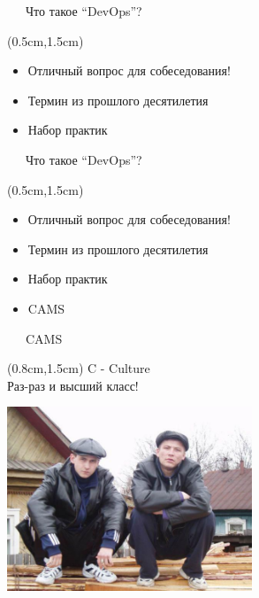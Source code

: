 \documentclass[xetex,18pt,aspectratio=43]{beamer}
\begin{document}
\begin{Large}
\begin{frame}{\ \ \ Что такое \enquote{DevOps}?}
\begin{textblock*}{\framewidth-0.8cm}(0.5cm,1.5cm)
\begin{itemize}
  \item Отличный вопрос для собеседования!
  \item Термин из прошлого десятилетия
  \item Набор практик
\end{itemize}
\end{textblock*}
\end{frame}

\begin{frame}{\ \ \ Что такое \enquote{DevOps}?}
\begin{textblock*}{\framewidth-0.8cm}(0.5cm,1.5cm)
\begin{itemize}
  \item Отличный вопрос для собеседования!
  \item Термин из прошлого десятилетия
  \item Набор практик
  \item CAMS
\end{itemize}
\end{textblock*}
\end{frame}

\begin{frame}{\ \ \ CAMS}
\begin{textblock*}{\framewidth}(0.8cm,1.5cm)
C - Culture\\
{\small Раз-раз и высший класс!}
\begin{minipage}{\textwidth}
  \centering
  \includegraphics[height=5.5cm]{img/culture}
\end{minipage}
\end{textblock*}
\end{frame}


\end{Large}
\end{document}
